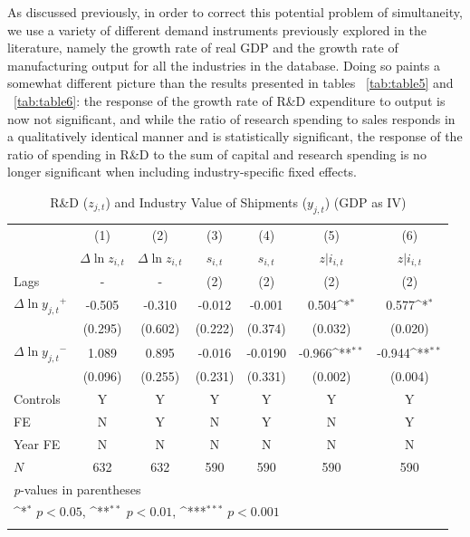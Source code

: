 \documentclass{_latex/house}
\begin{document}
As discussed previously, in order to correct this potential problem of simultaneity, we use a variety of different demand instruments previously explored in the literature, namely the growth rate of real GDP and the growth rate of manufacturing output for all the industries in the database. Doing so paints a somewhat different picture than the results presented in tables ~\ref{tab:table5} and ~\ref{tab:table6}: the response of the growth rate of R\&D expenditure to output is now not significant, and while the ratio of research spending to sales responds in a qualitatively identical manner and is statistically significant, the response of the ratio of spending in R\&D to the sum of capital and research spending is no longer significant when including industry-specific fixed effects.
\begin{table}[h!b]\footnotesize
\caption{R\&D ($z_{j,t}$) and Industry Value of Shipments ($y_{j,t}$) (GDP as IV)}
\begin{center}
{
\def\sym#1{\ifmmode^{#1}\else\(^{#1}\)\fi}
\begin{tabular}{l*{6}{c}}
\hline\hline
            &\multicolumn{1}{c}{(1)}&\multicolumn{1}{c}{(2)}&\multicolumn{1}{c}{(3)}&\multicolumn{1}{c}{(4)}&\multicolumn{1}{c}{(5)}&\multicolumn{1}{c}{(6)}\\
            &\multicolumn{1}{c}{$\Delta \ln{z_{i,t}}$}&\multicolumn{1}{c}{$\Delta \ln{z_{i,t}}$}&\multicolumn{1}{c}{$s_{i,t}$}&\multicolumn{1}{c}{$s_{i,t}$}&\multicolumn{1}{c}{$z|i_{i,t}$}&\multicolumn{1}{c}{$z|i_{i,t}$}\\
\hline
Lags & - & - & (2) & (2) & (2) & (2) \\
[1em]
$\Delta\ln{y_{j,t}}^{+}$ & -0.505 & -0.310 & -0.012 & -0.001 &  0.504\sym{*} & 0.577\sym{*} \\
 & (0.295) & (0.602) & (0.222) & (0.374) &  (0.032) & (0.020) \\
[1em]
$\Delta\ln{y_{j,t}}^{-}$ & 1.089 & 0.895 & -0.016 & -0.0190 & -0.966\sym{**} & -0.944\sym{**} \\
 & (0.096) & (0.255) & (0.231) & (0.331) & (0.002) & (0.004) \\
Controls & Y & Y & Y & Y & Y & Y \\
[1em]
FE & N & Y & N & Y & N & Y \\
[1em]
Year FE & N & N & N & N & N & N \\
\hline
\(N\)       &         632         &         632         &         590         &         590         &         590         &     590         \\
\hline\hline
\multicolumn{7}{l}{\footnotesize \textit{p}-values in parentheses}\\
\multicolumn{7}{l}{\footnotesize \sym{*} \(p<0.05\), \sym{**} \(p<0.01\), \sym{***} \(p<0.001\)}\\
\label{tab:table8}
\end{tabular}
}
\end{center}
\end{table}
\end{document}
